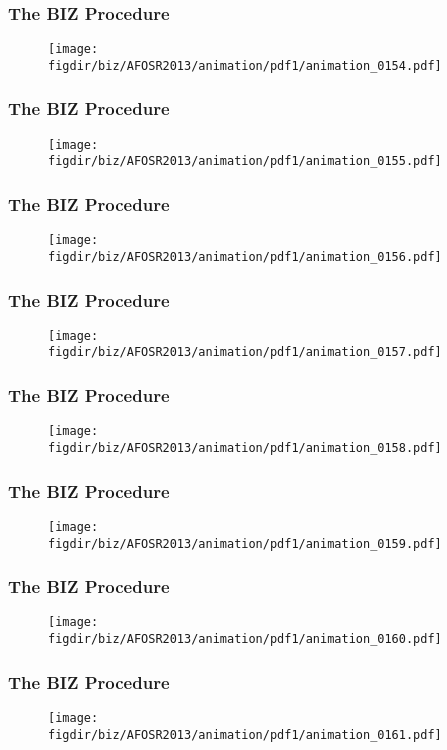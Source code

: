 \documentclass[13pt]{beamer}
\newcommand{\figdir}{../../fig}
\begin{document}
\begin{frame}\frametitle{The BIZ Procedure}\begin{figure}\texttt{[image: \\figdir/biz/AFOSR2013/animation/pdf1/animation\_0154.pdf]}\end{figure}\end{frame}
\begin{frame}\frametitle{The BIZ Procedure}\begin{figure}\texttt{[image: \\figdir/biz/AFOSR2013/animation/pdf1/animation\_0155.pdf]}\end{figure}\end{frame}
\begin{frame}\frametitle{The BIZ Procedure}\begin{figure}\texttt{[image: \\figdir/biz/AFOSR2013/animation/pdf1/animation\_0156.pdf]}\end{figure}\end{frame}
\begin{frame}\frametitle{The BIZ Procedure}\begin{figure}\texttt{[image: \\figdir/biz/AFOSR2013/animation/pdf1/animation\_0157.pdf]}\end{figure}\end{frame}
\begin{frame}\frametitle{The BIZ Procedure}\begin{figure}\texttt{[image: \\figdir/biz/AFOSR2013/animation/pdf1/animation\_0158.pdf]}\end{figure}\end{frame}
\begin{frame}\frametitle{The BIZ Procedure}\begin{figure}\texttt{[image: \\figdir/biz/AFOSR2013/animation/pdf1/animation\_0159.pdf]}\end{figure}\end{frame}
\begin{frame}\frametitle{The BIZ Procedure}\begin{figure}\texttt{[image: \\figdir/biz/AFOSR2013/animation/pdf1/animation\_0160.pdf]}\end{figure}\end{frame}
\begin{frame}\frametitle{The BIZ Procedure}\begin{figure}\texttt{[image: \\figdir/biz/AFOSR2013/animation/pdf1/animation\_0161.pdf]}\end{figure}\end{frame}
\end{document}
